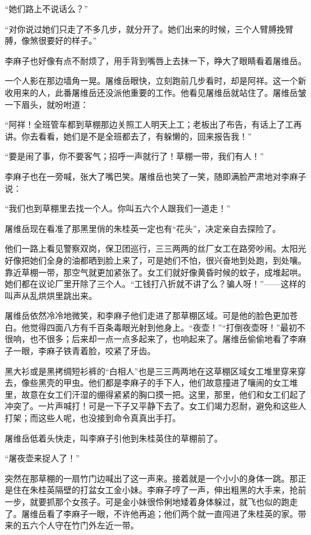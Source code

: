 \par “她们路上不说话么？”
\par “对你说过她们只走了不多几步，就分开了。她们出来的时候，三个人臂膊挽臂膊，像煞很要好的样子。”
\par 李麻子也好像有点不耐烦了，用手背到嘴唇上去抹一下，睁大了眼睛看着屠维岳。
\par 一个人影在那边墙角一晃。屠维岳眼快，立刻跑前几步看时，却是阿祥。这一个新收用来的人，此番屠维岳还没派他重要的工作。他看见屠维岳就站住了。屠维岳皱一下眉头，就吩咐道：
\par “阿祥！全班管车都到草棚那边关照工人明天上工；老板出了布告，有话上了工再讲。你去看看，她们是不是全班都去了，有躲懒的，回来报告我！”
\par “要是闹了事，你不要客气；招呼一声就行了！草棚一带，我们有人！”
\par 李麻子也在一旁喊，张大了嘴巴笑。屠维岳也笑了一笑，随即满脸严肃地对李麻子说：
\par “我们也到草棚里去找一个人。你叫五六个人跟我们一道走！”
\par 屠维岳现在看准了那黑里俏的朱桂英一定也有“花头”，决定亲自去探险了。
\par 他们一路上看见警察双岗，保卫团巡行，三三两两的丝厂女工在路旁吵闹。太阳光好像把她们全身的油都晒到脸上来了，可是她们不怕，很兴奋地到处跑，到处嚷。靠近草棚一带，那空气就更加紧张了。女工们就好像黄昏时候的蚊子，成堆起哄。她们都在议论厂里开除了三个人。“工钱打八折就不讲了么？骗人呀！”——这样的叫声从乱烘烘里跳出来。
\par 屠维岳依然冷冷地微笑，和李麻子他们走进了那草棚区域。可是他的脸色更加苍白。他觉得四面八方有千百条毒眼光射到他身上。“夜壶！”“打倒夜壶呀！”最初不很响，也不很多；后来却一点一点多起来了，也响起来了。屠维岳偷偷地看了李麻子一眼，李麻子铁青着脸，咬紧了牙齿。
\par 黑大衫或是黑拷绸短衫裤的“白相人”也是三三两两地在这草棚区域女工堆里穿来穿去，像些黑壳的甲虫。他们都是李麻子的手下人，他们故意撞进了嚷闹的女工堆里，故意在女工们汗湿的绷得紧紧的胸口摸一把。这里，那里，他们和女工们起了冲突了。一片声喊打！可是一下子又平静下去了。女工们竭力忍耐，避免和这些人打架；而这些人呢，也没接到命令真真出手打。
\par 屠维岳低着头快走，叫李麻子引他到朱桂英住的草棚前了。
\par “屠夜壶来捉人了！”
\par 突然在那草棚的一扇竹门边喊出了这一声来。接着就是一个小小的身体一跳。那正是住在朱桂英隔壁的打盆女工金小妹。李麻子哼了一声，伸出粗黑的大手来，抢前一步，就要抓那个女孩子。可是金小妹很伶俐地矮着身体躲过，就飞也似的跑走了。屠维岳看了李麻子一眼，不许他再追；他们两个就一直闯进了朱桂英的家。带来的五六个人守在竹门外左近一带。
